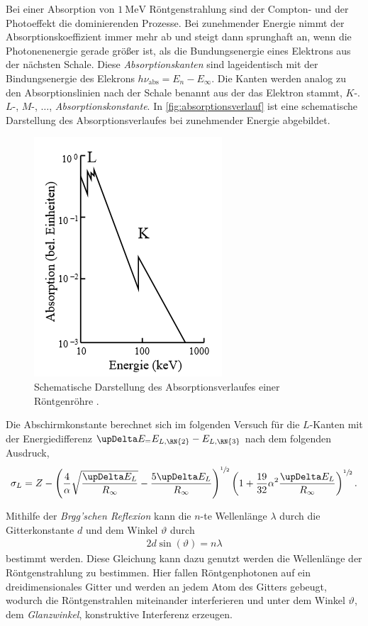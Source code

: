 Bei einer Absorption von $\SI{1}{\mega\eV}$ Röntgenstrahlung sind der Compton- und der Photoeffekt die dominierenden Prozesse. Bei zunehmender Energie nimmt
der Absorptionskoeffizient immer mehr ab und steigt dann sprunghaft an, wenn die Photonenenergie gerade größer ist, als die Bundungsenergie eines Elektrons aus der nächsten Schale. Diese
\textit{Absorptionskanten} sind lageidentisch mit der Bindungsenergie des Elekrons $h\nu_{\text{abs}} = E_n - E_\infty$. Die Kanten werden analog zu den Absorptionslinien nach der Schale benannt aus der das Elektron stammt, $K$-. $L$-, $M$-, $\dots$, \textit{Absorptionskonstante}.
In \autoref{fig:absorptionsverlauf} ist eine schematische Darstellung des Absorptionsverlaufes bei zunehmender Energie abgebildet.
\begin{figure}[H]
    \centering
    \includegraphics[width = 0.4 \textwidth]{data/absorptionsspektrum.png}
    \caption{Schematische Darstellung des Absorptionsverlaufes einer Röntgenröhre \cite{Anleitung602}.}
    \label{fig:absorptionsverlauf}
\end{figure}

Die Abschirmkonstante berechnet sich im folgenden Versuch für die $L$-Kanten mit der Energiedifferenz $\upDelta E_ = E_{L, \RN{2}} - E_{L, \RN{3}}$ nach dem folgenden Ausdruck,
\begin{align}
    \label{eqn:abschirmkonstante}
    \sigma_L = Z-\left(\frac 4\alpha \sqrt{\frac{\upDelta E_L}{R_\infty}} - \frac{5\upDelta E_L}{R_\infty}\right)^{\sfrac 12} \left(1+ \frac{19}{32}\alpha^2\frac{\upDelta E_L}{R_\infty}\right)^{\sfrac 12}.
\end{align}

Mithilfe der \textit{Brgg'schen Reflexion} kann die $n$-te Wellenlänge $\lambda$ durch die Gitterkonstante $d$ und dem Winkel $\vartheta$ durch 
\begin{align}
    \label{eqn:bragg}
    2d\sin(\vartheta)=n\lambda
\end{align}
bestimmt werden. Diese Gleichung kann dazu genutzt werden die Wellenlänge der Röntgenstrahlung zu bestimmen. Hier fallen Röntgenphotonen auf ein dreidimensionales Gitter und werden an jedem Atom des
Gitters gebeugt, wodurch die Röntgenstrahlen miteinander interferieren und unter dem Winkel $\vartheta$, dem \textit{Glanzwinkel}, konstruktive Interferenz erzeugen.